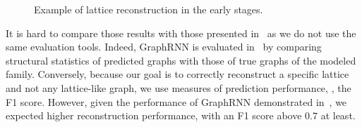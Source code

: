 \begin{figure}
    \centering
    \caption{Example of lattice reconstruction in the early stages.}%
    \label{fig:graph-reconstruction}
\end{figure}

It is hard to compare those results with those presented in~\cite{graphrnn:2018:jiaxuan} as we do not use the same evaluation tools.
Indeed, GraphRNN is evaluated in~\cite{graphrnn:2018:jiaxuan} by comparing structural statistics of predicted graphs with those of true graphs of the modeled family.
Conversely, because our goal is to correctly reconstruct a specific lattice and not any lattice-like graph, we use measures of prediction performance, \eg, the F1 score.
However, given the performance of GraphRNN demonstrated in~\cite{graphrnn:2018:jiaxuan}, we expected higher reconstruction performance, with an F1 score above $0.7$ at least.


